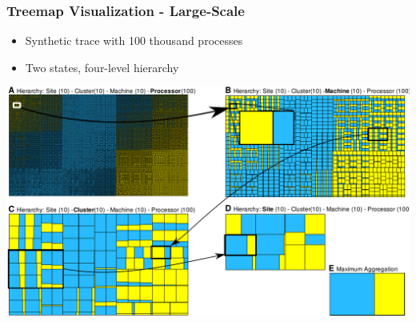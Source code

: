 \frame
{
   \frametitle{Treemap Visualization - Large-Scale}

   \begin{itemize}
   \item Synthetic trace with 100 thousand processes
   \item Two states, four-level hierarchy
   \end{itemize}

   \vfill
   \includegraphics[width=\textwidth]{img/large-scale.pdf}
}


%
%


